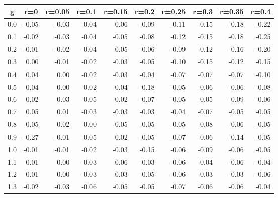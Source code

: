 %
\begin{table}[!tbp]
 \begin{center}
 \begin{tabular}{rrrrrrrrrr}\hline\hline
\multicolumn{1}{c}{g}&\multicolumn{1}{c}{r=0}&\multicolumn{1}{c}{r=0.05}&\multicolumn{1}{c}{r=0.1}&\multicolumn{1}{c}{r=0.15}&\multicolumn{1}{c}{r=0.2}&\multicolumn{1}{c}{r=0.25}&\multicolumn{1}{c}{r=0.3}&\multicolumn{1}{c}{r=0.35}&\multicolumn{1}{c}{r=0.4}\tabularnewline
\hline
0.0&-0.05&-0.03&-0.04&-0.06&-0.09&-0.11&-0.15&-0.18&-0.22\tabularnewline
0.1&-0.02&-0.03&-0.04&-0.05&-0.08&-0.12&-0.15&-0.18&-0.25\tabularnewline
0.2&-0.01&-0.02&-0.04&-0.05&-0.06&-0.09&-0.12&-0.16&-0.20\tabularnewline
0.3& 0.00&-0.01&-0.02&-0.03&-0.05&-0.10&-0.15&-0.12&-0.15\tabularnewline
0.4& 0.04& 0.00&-0.02&-0.03&-0.04&-0.07&-0.07&-0.07&-0.10\tabularnewline
0.5& 0.04& 0.00&-0.02&-0.04&-0.18&-0.05&-0.06&-0.06&-0.08\tabularnewline
0.6& 0.02& 0.03&-0.05&-0.02&-0.07&-0.05&-0.05&-0.09&-0.06\tabularnewline
0.7& 0.05& 0.01&-0.03&-0.03&-0.03&-0.04&-0.07&-0.05&-0.05\tabularnewline
0.8& 0.05& 0.02& 0.00&-0.05&-0.05&-0.05&-0.08&-0.06&-0.05\tabularnewline
0.9&-0.27&-0.01&-0.05&-0.02&-0.05&-0.07&-0.06&-0.14&-0.05\tabularnewline
1.0&-0.01&-0.01&-0.02&-0.03&-0.15&-0.06&-0.09&-0.06&-0.05\tabularnewline
1.1& 0.01& 0.00&-0.03&-0.06&-0.03&-0.06&-0.04&-0.06&-0.04\tabularnewline
1.2& 0.01& 0.00&-0.03&-0.03&-0.05&-0.06&-0.03&-0.03&-0.06\tabularnewline
1.3&-0.02&-0.03&-0.06&-0.05&-0.05&-0.07&-0.06&-0.06&-0.04\tabularnewline
\hline
\end{tabular}

\end{center}

\end{table}

